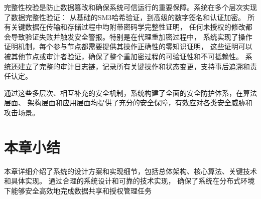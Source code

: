 完整性校验是防止数据篡改和确保系统可信运行的重要保障。系统在多个层次实现了数据完整性验证：
从基础的SM3哈希验证，到高级的数字签名和认证加密。
所有关键数据在传输和存储过程中均附带密码学完整性证明，
任何未授权的修改都会导致验证失败并触发安全警报。特别是在代理重加密过程中，
系统实现了操作证明机制，每个参与节点都需要提供其操作正确性的零知识证明，
这些证明可以被其他节点或审计者验证，确保了整个重加密过程的可验证性和不可抵赖性。
系统还建立了完整的审计日志链，记录所有关键操作和状态变更，支持事后追溯和责任认定。

通过这些多层次、相互补充的安全机制，系统构建了全面的安全防护体系，在算法层面、
架构层面和应用层面均提供了充分的安全保障，有效应对各类安全威胁和攻击场景。

\section{本章小结}
本章详细介绍了系统的设计方案和实现细节，包括总体架构、核心算法、关键技术和具体实现。
通过合理的系统设计和可靠的技术实现，
确保了系统在分布式环境下能够安全高效地完成数据共享和授权管理任务
